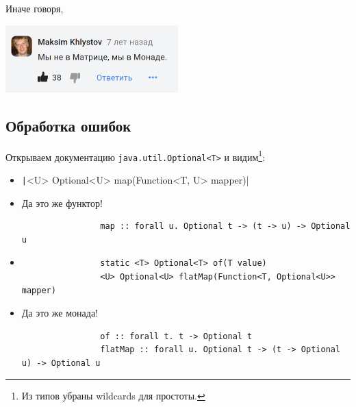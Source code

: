     \begin{frame}[fragile]{Иначе говоря,}
        \begin{center}
            \includegraphics[width=0.5\textwidth]{figs/nomatrix}
        \end{center}
    \end{frame}


    \subsection{Обработка ошибок}

    \begin{frame}[fragile]{\subsecname}
        \vspace{-0.5em}
        Открываем документацию \texttt{java.util.Optional<T>} и видим\footnote{Из типов убраны wildcards для простоты.}:
        \begin{itemize}
            \item \texttt|<U> Optional<U> map(Function<T, U> mapper)|
            \item[\then] Да это же функтор!
            \begin{verbatim}
                map :: forall u. Optional t -> (t -> u) -> Optional u
            \end{verbatim}
            \item \begin{verbatim}
                static <T> Optional<T> of(T value)
                <U> Optional<U> flatMap(Function<T, Optional<U>> mapper)
            \end{verbatim}
            \item[\then] Да это же монада!
            \begin{verbatim}
                of :: forall t. t -> Optional t
                flatMap :: forall u. Optional t -> (t -> Optional u) -> Optional u
            \end{verbatim}
        \end{itemize}
    \end{frame}

